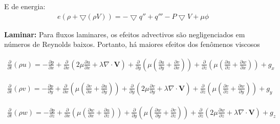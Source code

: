 \documentclass[]{article}
\begin{document}
E de energia:
\begin{equation}
	\begin{aligned}
		 e( \rho +  \bigtriangledown (\rho V)) = -\bigtriangledown q'' + q''' - P\bigtriangledown V + \mu \phi
	\end{aligned}
\end{equation}

\textbf{Laminar:}
Para fluxos laminares, os efeitos advectivos são negligenciados em números de Reynolds baixos. Portanto, há maiores efeitos dos fenômenos viscosos

\begin{equation}
	\begin{aligned}
		\frac{\partial}{\partial t} (\rho u)=
		- \frac{\partial p}{\partial x} + \frac{\partial}{\partial x} \left( 2 \mu \frac{\partial u}{\partial x} + \lambda \nabla \cdot \mathbf{V} \right) +
		\frac{\partial}{\partial y} \left( \mu \left( \frac{\partial u}{\partial y} + \frac{\partial v}{\partial x} \right) \right) +
		\frac{\partial}{\partial z} \left( \mu \left( \frac{\partial u}{\partial z} + \frac{\partial w}{\partial x} \right) \right) + g_x
	\end{aligned}
\end{equation}


\begin{equation}
	\begin{aligned}
		\frac{\partial}{\partial t} (\rho v)  = 
		- \frac{\partial p}{\partial y} + \frac{\partial}{\partial x} \left( \mu \left( \frac{\partial v}{\partial x} + \frac{\partial u}{\partial y} \right) \right) +
		\frac{\partial}{\partial y} \left( 2 \mu \frac{\partial v}{\partial y} + \lambda \nabla \cdot \mathbf{V} \right) +
		\frac{\partial}{\partial z} \left( \mu \left( \frac{\partial v}{\partial z} + \frac{\partial w}{\partial y} \right) \right) +  g_y
	\end{aligned}
\end{equation}

\begin{equation}
	\begin{aligned}
		\frac{\partial}{\partial t} (\rho w) =
		- \frac{\partial p}{\partial z} + \frac{\partial}{\partial x} \left( \mu \left( \frac{\partial w}{\partial x} + \frac{\partial u}{\partial z} \right) \right) +
		\frac{\partial}{\partial y} \left( \mu \left( \frac{\partial w}{\partial y} + \frac{\partial v}{\partial z} \right) \right) +
		\frac{\partial}{\partial z} \left( 2 \mu \frac{\partial w}{\partial z} + \lambda \nabla \cdot \mathbf{V} \right) +  g_z
	\end{aligned}
\end{equation}
 
\end{document}
